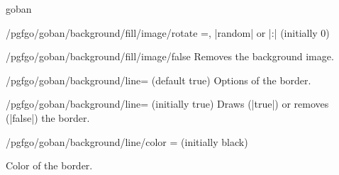 \begin{environment}{{goban}}
\begin{key}{/pgfgo/goban/background/fill/image/rotate =, |random| or |:| (initially 0)}
		\begin{codeexample}[]
			\begin{goban}[5, background = {fill = {image = {
				file = pgfgo-board.jpg, rotate = 90}}}]
			\end{goban}

			\begin{goban}[5, background = {fill = {image = {
				file = pgfgo-board.jpg, fit = tile, width = 1cm, rotate = random}}}]
			\end{goban}
		\end{codeexample}
	\end{key}

	\begin{stylekey}{/pgfgo/goban/background/fill/image/false}
		Removes the background image.
	\end{stylekey}

	\begin{key}{/pgfgo/goban/background/line= (default true)}
		Options of the border.
	\end{key}

	\begin{key}{/pgfgo/goban/background/line= (initially true)}
		Draws (|true|) or removes (|false|) the border.

		\begin{codeexample}[]

			\begin{goban}[background = {line = {color = red}}, name = a]
			\end{goban}

			\begin{goban}[background = {line = false}, resume = a]
			\end{goban}
		\end{codeexample}
	\end{key}

	\begin{key}{/pgfgo/goban/background/line/color = (initially black)}

		Color of the border.

		\begin{codeexample}[]

			\begin{goban}[background = {line = {color = red}}, name = a]
			\end{goban}


\end{codeexample}
\end{key}
\end{environment}
